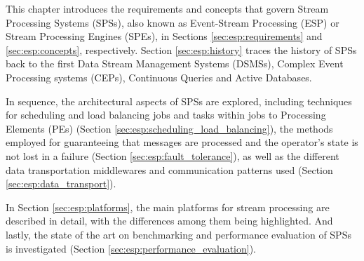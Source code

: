 \documentclass[ppgc,diss,english]{iiufrgs}
\begin{document}
%
%

%


This chapter introduces the requirements and concepts that govern Stream Processing Systems (SPSs), also known as Event-Stream Processing (ESP) or Stream Processing Engines (SPEs), in Sections \ref{sec:esp:requirements} and \ref{sec:esp:concepts}, respectively. Section \ref{sec:esp:history} traces the history of SPSs back to the first Data Stream Management Systems (DSMSs), Complex Event Processing systems (CEPs), Continuous Queries and Active Databases.

In sequence, the architectural aspects of SPSs are explored, including techniques for scheduling and load balancing jobs and tasks within jobs to Processing Elements (PEs) (Section \ref{sec:esp:scheduling_load_balancing}), the methods employed for guaranteeing that messages are processed and the operator's state is not lost in a failure (Section \ref{sec:esp:fault_tolerance}), as well as the different data transportation middlewares and communication patterns used (Section \ref{sec:esp:data_transport}).

In Section \ref{sec:esp:platforms}, the main platforms for stream processing are described in detail, with the differences among them being highlighted. And lastly, the state of the art on benchmarking and performance evaluation of SPSs is investigated (Section \ref{sec:esp:performance_evaluation}).
\end{document}
